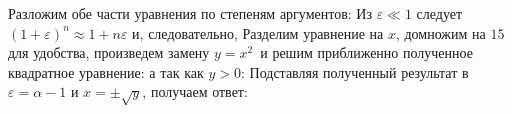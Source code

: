 \documentclass[a4paper, 12pt]{article}
\begin{document}
Разложим обе части уравнения по степеням аргументов:
Из $\varepsilon \ll 1$ следует $(1 + \varepsilon)^n \approx 1 + n\varepsilon$ и, следовательно,
Разделим уравнение на $x$, домножим на $15$ для удобства, произведем замену $y = x^2$\
и решим приближенно полученное квадратное уравнение:
а так как $y > 0$:
Подставляя полученный результат в $\varepsilon = \alpha - 1$ и $x = \pm\sqrt{y}$, получаем ответ:
\salign[*]{\boxed{\tilde{x}_0 = 0,\ \tilde{x}_{1,2} \approx \pm\sqrt{15\sqrt{\alpha - 1}}}}
\end{document}
